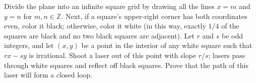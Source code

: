 Divide the plane into an infinite square grid by drawing all the lines $x=m$ and $y=n$ for $m,n \in \mathbb Z$. Next, if a square's upper-right corner has both coordinates even, color it black; otherwise, color it white (in this way, exactly $1/4$ of the squares are black and no two black squares are adjacent). Let $r$ and $s$ be odd integers, and let $(x,y)$ be a point in the interior of any white square such that $rx-sy$ is irrational. Shoot a laser out of this point with slope $r/s$; lasers pass through white squares and reflect off black squares. Prove that the path of this laser will form a closed loop.